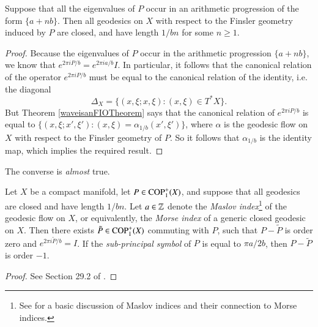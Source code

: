 \begin{theorem}
  Suppose that all the eigenvalues of $P$ occur in an arithmetic progression of the form $\{ a + n b \}$. Then all geodesics on $X$ with respect to the Finsler geometry induced by $P$ are closed, and have length $1/bn$ for some $n \geq 1$.
\end{theorem}
\begin{proof}
  Because the eigenvalues of $P$ occur in the arithmetic progression $\{ a + nb \}$, we know that $e^{2 \pi i P/b} = e^{2 \pi i a/b} I$. In particular, it follows that the canonical relation of the operator $e^{2 \pi i P/b}$ must be equal to the canonical relation of the identity, i.e. the diagonal
  \begin{equation}
    \Delta_X = \{ (x,\xi;x,\xi) : (x,\xi) \in T^* X \}.
  \end{equation}
  But Theorem \ref{waveisanFIOTheorem} says that the canonical relation of $e^{2 \pi i P/b}$ is equal to $\{ (x,\xi;x',\xi'): (x,\xi) = \alpha_{1/b}(x',\xi') \}$, where $\alpha$ is the geodesic flow on $X$ with respect to the Finsler geometry of $P$. So it follows that $\alpha_{1/b}$ is the identity map, which implies the required result.
\end{proof}

The converse is \emph{almost} true.
%
%
%
% 
% 
%
% 

\begin{theorem} \label{Thmaodjwaiodjawio32141}
  Let $X$ be a compact manifold, let $P \in {\text{COP}^{+}_{{1}}}(X)$, and suppose that all geodesics are closed and have length $1/bn$. Let $a \in \operatorname{\mathbb{Z}}$ denote the \emph{Maslov index}\footnote{See \cite{DuistermaatMorse} for a basic discussion of Maslov indices and their connection to Morse indices.} of the geodesic flow on $X$, or equivalently, the \emph{Morse index} of a generic closed geodesic on $X$. Then there exists $\tilde{P} \in {\text{COP}^{+}_{{1}}}(X)$ commuting with $P$, such that $P - \tilde{P}$ is order zero and $e^{2 \pi i \tilde{P} / b} = I$. If the \emph{sub-principal symbol} of $P$ is equal to $\pi a / 2 b$, then $P - \tilde{P}$ is order $-1$.
\end{theorem}
\begin{proof}
  See Section 29.2 of \cite{Hormander4}.
\end{proof}


